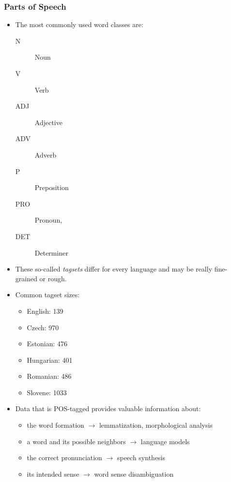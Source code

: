             \subsubsection{Parts of Speech} %
                \begin{itemize}
                	\item The most commonly used word classes are:
                		\begin{description}
                			\item[N] Noun
                			\item[V] Verb
                			\item[ADJ] Adjective
                			\item[ADV] Adverb
                			\item[P] Preposition
                			\item[PRO] Pronoun,
                			\item[DET] Determiner
                		\end{description}
                	\item These so-called \textit{tagsets} differ for every language and may be really fine-grained or rough.
                	\item Common tagset sizes:
                		\begin{itemize}
                			\item English: 139
                			\item Czech: 970
                			\item Estonian: 476
                			\item Hungarian: 401
                			\item Romanian: 486
                			\item Slovene: 1033
                		\end{itemize}
                	\item Data that is POS-tagged provides valuable information about:
                		\begin{itemize}
                			\item the word formation \( \rightarrow \) lemmatization, morphological analysis
                			\item a word and its possible neighbors \( \rightarrow \) language models
                			\item the correct pronunciation \( \rightarrow \) speech synthesis
                			\item its intended sense \( \rightarrow \) word sense disambiguation

\end{itemize}
\end{itemize}
